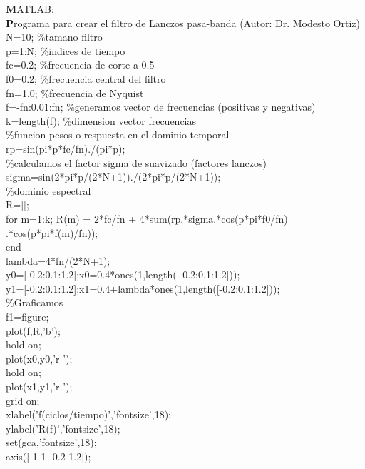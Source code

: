 \documentclass[
]{agujournal2019}
\begin{document}
\begin{framed}
{\noindent \textbf MATLAB:}\\
{\textbf Programa para crear el filtro de Lanczos pasa-banda (Autor: Dr. Modesto Ortiz)}\\
{\noindent}N=10;   \%tamano filtro\\
p=1:N;  \%indices de tiempo \\
fc=0.2; \%frecuencia de corte a 0.5\\
f0=0.2; \%frecuencia central del filtro\\
fn=1.0; \%frecuencia de Nyquist \\
f=-fn:0.01:fn; \%generamos vector de frecuencias (positivas y negativas)\\
k=length(f);   \%dimension vector frecuencias \\

\%funcion pesos o respuesta en el dominio temporal
\\
rp=sin(pi*p*fc/fn)./(pi*p);\\
\%calculamos el factor sigma de suavizado (factores lanczos)
sigma=sin(2*pi*p/(2*N+1))./(2*pi*p/(2*N+1)); \\
\%dominio espectral
\\
R=[];\\
for m=1:k; %
    R(m) = 2*fc/fn + 4*sum(rp.*sigma.*cos(p*pi*f0/fn)\\
    .*cos(p*pi*f(m)/fn));\\
end\\
lambda=4*fn/(2*N+1);\\
y0=[-0.2:0.1:1.2];x0=0.4*ones(1,length([-0.2:0.1:1.2]));\\
y1=[-0.2:0.1:1.2];x1=0.4+lambda*ones(1,length([-0.2:0.1:1.2]));\\
\%Graficamos\\
f1=figure;\\
plot(f,R,'b'); \\
hold on;\\
plot(x0,y0,'r-');\\
hold on;\\
plot(x1,y1,'r-');\\
grid on;\\
xlabel('f(ciclos/tiempo)','fontsize',18);\\
ylabel('R(f)','fontsize',18);\\
set(gca,'fontsize',18);\\
axis([-1 1 -0.2 1.2]);\\
\end{framed}
\end{document}
